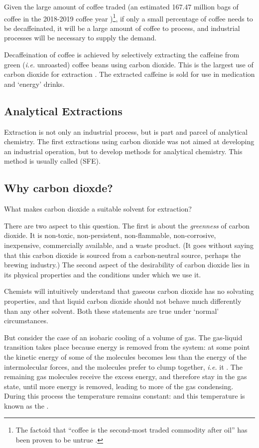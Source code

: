Given the large amount of coffee traded (an estimated 167.47 million bags of
coffee in the 2018-2019 coffee year \autocite{Coffee2018})\footnote{The factoid
that ``coffee is the second-most traded commodity after oil'' has been proven to
be untrue \autocite{Greenberg2017}.}, if only a small percentage of coffee needs
to be decaffeinated, it will be a large amount of coffee to process, and
industrial processes will be necessary to supply the demand.

Decaffeination of coffee is achieved by selectively extracting the caffeine from
green (\textit{i.e.} unroasted) coffee beans using carbon dioxide. This is the
largest use of carbon dioxide for extraction \autocite{Ramalakshmi1999}. The
extracted caffeine is sold for use in medication and `energy' drinks.

\subsection{Analytical Extractions}

Extraction is not only an industrial process, but is part and parcel of analytical
chemistry. The first extractions using carbon dioxide was not aimed at developing
an industrial operation, but to develop methods for analytical chemistry. This
method is usually called  (SFE).

\subsection{Why carbon dioxde?}

What makes carbon dioxide a suitable solvent for extraction?

There are two aspect to this question. The first is about the \textit{greenness}
of carbon dioxide. It is non-toxic, non-persistent, non-flammable,
non-corrosive, inexpensive, commercially available, and a waste product. (It
goes without saying that this carbon dioxide is sourced from a carbon-neutral
source, perhaps the brewing industry.) The second aspect of the desirability of
carbon dioxide lies in its physical properties and the conditions under which we
use it.

Chemists will intuitively understand that gaseous carbon dioxide has no solvating
properties, and that liquid carbon dioxide should not behave much differently
than any other solvent. Both these statements are true under `normal' circumstances.

But consider the case of an isobaric cooling of a volume of gas. The gas-liquid
transition takes place because energy is removed from the system: at some point
the kinetic energy of some of the molecules becomes less than the energy of the
intermolecular forces, and the molecules prefer to clump together, \textit{i.e.}
it . The remaining gas molecules receive the excess energy,
and therefore stay in the gas state, until more energy is removed, leading to
more of the gas condensing. During this process the temperature remains
constant: and this temperature is known as the .

